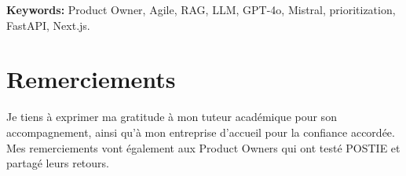 \documentclass[12pt,a4paper,oneside]{report}
\begin{document}
\vspace{1em}\noindent\textbf{Keywords:} Product Owner, Agile, RAG, LLM,
GPT-4o, Mistral, prioritization, FastAPI, Next.js.

\chapter*{Remerciements}
Je tiens à exprimer ma gratitude à mon tuteur académique pour son
accompagnement, ainsi qu'à mon entreprise d'accueil pour la confiance
accordée. Mes remerciements vont également aux Product Owners qui ont
testé POSTIE et partagé leurs retours.

\tableofcontents
\listoffigures
\listoftables
\printglossary[type=\acronymtype,title={Liste des acronymes}]










\appendix






\end{document}
